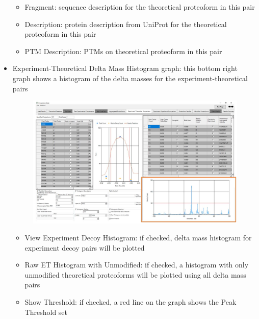 \begin{itemize}
\begin{itemize}
	\item Fragment: sequence description for the theoretical proteoform in this pair
	\item Description: protein description from UniProt for the theoretical proteoform in this pair
	\item PTM Description: PTMs on theoretical proteoform in this pair
\end{itemize}
\pagebreak
\item Experiment-Theoretical Delta Mass Histogram graph: this bottom right graph shows a histogram of the delta masses for the experiment-theoretical pairs
\begin{figure}[h]
\centering
\includegraphics[scale=0.46]{figures/et5.jpg}
\end{figure}
\begin{itemize} 
	\item View Experiment Decoy Histogram: if checked, delta mass histogram for experiment decoy pairs will be plotted
	\item Raw ET Histogram with Unmodified: if checked, a histogram with only unmodified theoretical proteoforms will be plotted using all delta mass pairs
	\item Show Threshold: if checked, a red line on the graph shows the Peak Threshold set
	\end{itemize}
\end{itemize}